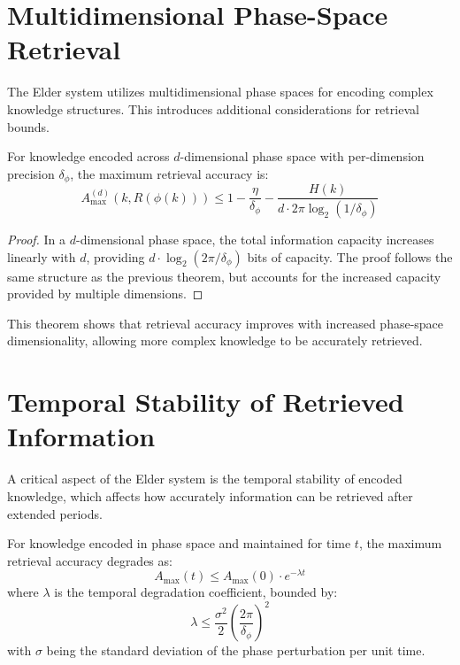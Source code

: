 \section{Multidimensional Phase-Space Retrieval}

The Elder system utilizes multidimensional phase spaces for encoding complex knowledge structures. This introduces additional considerations for retrieval bounds.

\begin{theorem}
For knowledge encoded across $d$-dimensional phase space with per-dimension precision $\delta_\phi$, the maximum retrieval accuracy is:
\begin{equation}
A_{\max}^{(d)}(k, R(\phi(k))) \leq 1 - \frac{\eta}{\delta_\phi} - \frac{H(k)}{d \cdot 2\pi \log_2(1/\delta_\phi)}
\end{equation}
\end{theorem}

\begin{proof}
In a $d$-dimensional phase space, the total information capacity increases linearly with $d$, providing $d \cdot \log_2(2\pi / \delta_\phi)$ bits of capacity. The proof follows the same structure as the previous theorem, but accounts for the increased capacity provided by multiple dimensions.
\end{proof}

This theorem shows that retrieval accuracy improves with increased phase-space dimensionality, allowing more complex knowledge to be accurately retrieved.

\section{Temporal Stability of Retrieved Information}

A critical aspect of the Elder system is the temporal stability of encoded knowledge, which affects how accurately information can be retrieved after extended periods.

\begin{theorem}
For knowledge encoded in phase space and maintained for time $t$, the maximum retrieval accuracy degrades as:
\begin{equation}
A_{\max}(t) \leq A_{\max}(0) \cdot e^{-\lambda t}
\end{equation}
where $\lambda$ is the temporal degradation coefficient, bounded by:
\begin{equation}
\lambda \leq \frac{\sigma^2}{2}\left(\frac{2\pi}{\delta_\phi}\right)^2
\end{equation}
with $\sigma$ being the standard deviation of the phase perturbation per unit time.
\end{theorem}

